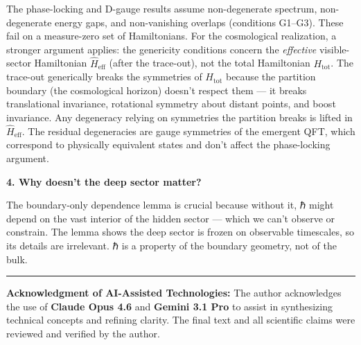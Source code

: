 \documentclass[
]{article}
\begin{document}
The phase-locking and D-gauge results assume non-degenerate spectrum,
non-degenerate energy gaps, and non-vanishing overlaps (conditions
G1--G3). These fail on a measure-zero set of Hamiltonians. For the
cosmological realization, a stronger argument applies: the genericity
conditions concern the \emph{effective} visible-sector Hamiltonian
\(\hat{H}_{\text{eff}}\) (after the trace-out), not the total
Hamiltonian \(H_{\text{tot}}\). The trace-out generically breaks the
symmetries of \(H_{\text{tot}}\) because the partition boundary (the
cosmological horizon) doesn't respect them --- it breaks translational
invariance, rotational symmetry about distant points, and boost
invariance. Any degeneracy relying on symmetries the partition breaks is
lifted in \(\hat{H}_{\text{eff}}\). The residual degeneracies are gauge
symmetries of the emergent QFT, which correspond to physically
equivalent states and don't affect the phase-locking argument.

\textbf{4. Why doesn't the deep sector matter?}

The boundary-only dependence lemma is crucial because without it, ℏ
might depend on the vast interior of the hidden sector --- which we
can't observe or constrain. The lemma shows the deep sector is frozen on
observable timescales, so its details are irrelevant. ℏ is a property of
the boundary geometry, not of the bulk.

\begin{center}\rule{0.5\linewidth}{0.5pt}\end{center}

\textbf{Acknowledgment of AI-Assisted Technologies:} The author
acknowledges the use of \textbf{Claude Opus 4.6} and \textbf{Gemini 3.1
Pro} to assist in synthesizing technical concepts and refining clarity.
The final text and all scientific claims were reviewed and verified by
the author.
\end{document}
